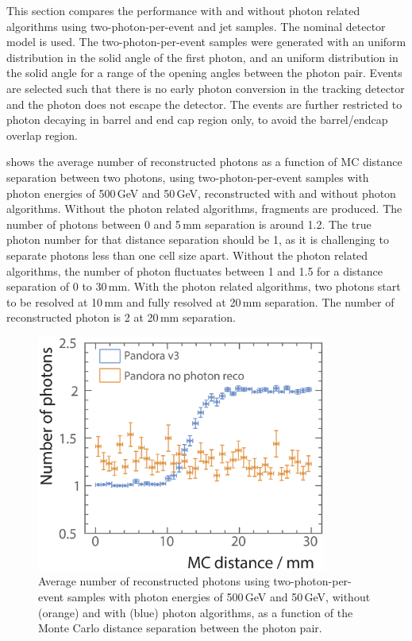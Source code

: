 This section compares the performance with and without photon related algorithms using  two-photon-per-event and jet samples. The nominal \ILD detector model is used. The two-photon-per-event samples were generated with an uniform distribution in the solid angle of the first photon, and an uniform distribution in the solid angle  for a range of the opening angles  between the photon pair. Events are selected such that there is no early photon conversion in the tracking detector and the photon does not escape the detector. The events are further restricted to photon decaying in barrel and end cap region only, to avoid the barrel/endcap overlap region.


 shows the average number of reconstructed photons as a function of MC distance separation between two photons,   using  two-photon-per-event samples
with photon energies of  500\,GeV and 50\,GeV,   reconstructed with and without photon algorithms. Without the photon related algorithms, fragments are produced.  The number of photons between 0 and 5\,mm separation is around 1.2. The true photon number for that distance separation should be 1, as it is challenging to separate photons less than one \ECAL cell size apart.  Without the photon related algorithms, the number of photon fluctuates between 1 and 1.5 for a distance separation of 0 to 30\,mm. With the photon related algorithms, two photons start to be resolved at 10\,mm and fully resolved at 20\,mm separation.  The number of reconstructed photon is 2 at 20\,mm separation.


\begin{figure}[tbph]
\centering
\includegraphics[width=0.85\textwidth]{photon/nPhotonVSnoPhotonReco2}
\caption[Average number of photons using two photons of 500 and 50\,GeV per event sample.]
{Average number of reconstructed  photons using two-photon-per-event samples with photon energies of  500\,GeV and 50\,GeV, without (orange) and with (blue) photon algorithms, as a function of the Monte Carlo distance separation between the photon pair.}
\label{fig:photonDoublePerformanceNoReco}
\end{figure}




